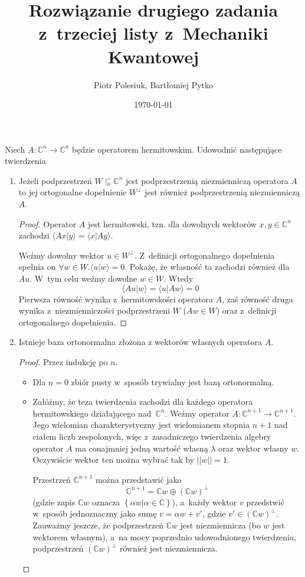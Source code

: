 \documentclass{article}
\title{Rozwiązanie drugiego zadania z~trzeciej listy z~Mechaniki Kwantowej}
\author{Piotr Polesiuk, Bartłomiej Pytko}
\date{\today}
\begin{document}
\maketitle

Niech $A\colon\mathbb{C}^n\to \mathbb{C}^n$
będzie operatorem hermitowskim. Udowodnić następujące twierdzenia
\begin{enumerate}
\item
Jeżeli podprzestrzeń $W\subseteq \mathbb{C}^n$ jest podprzestrzenią
niezmienniczą operatora $A$ to jej ortogonalne dopełnienie
$W^\perp$ jest również podprzestrzenią niezmienniczą $A$.

\begin{proof}
Operator $A$ jest hermitowski, tzn. dla dowolnych wektorów 
$x,y\in\mathbb{C}^n$ zachodzi 
\mbox{$\langle{}Ax|y\rangle=\langle{}x|Ay\rangle$}.

Weźmy dowolny wektor $u\in W^\perp$. Z~definicji ortogonalnego dopełnienia 
spełnia on $\forall w\in W.\langle{}u|w\rangle=0$. Pokażę, że własność ta 
zachodzi również dla $Au$. W~tym celu weźmy dowolne $w\in W$. Wtedy
\[
\langle{}Au|w\rangle = \langle{}u|Aw\rangle = 0
\]
Pierwsza równość wynika z~hermitowskości operatora $A$, zaś równość 
druga wynika z~niezmienniczości podprzestrzeni $W$ ($Aw \in W$) oraz 
z~definicji ortogonalnego dopełnienia.
\end{proof}

\item
Istnieje baza ortonormalna złożona z wektorów własnych operatora $A$.

\begin{proof}
Przez indukcję po $n$.
\begin{itemize}
\item Dla $n=0$ zbiór pusty w~sposób trywialny jest bazą ortonormalną.
\item Załóżmy, że teza twierdzenia zachodzi dla każdego operatora 
hermitowskiego działającego nad~$\mathbb{C}^n$. 
Weźmy operator $A\colon\mathbb{C}^{n+1}\to\mathbb{C}^{n+1}$.
Jego wielomian charakterystyczny jest wielomianem stopnia $n+1$ nad
ciałem liczb zespolonych, więc z~zasadniczego twierdzenia algebry
operator $A$ ma conajmniej jedną wartość własną $\lambda$ oraz wektor 
własny $w$. Oczywiście wektor ten można wybrać tak by $||w||=1$.

Przestrzeń $\mathbb{C}^{n+1}$ można przedstawić jako
\[
\mathbb{C}^{n+1} = \mathbb{C}w \oplus \left(\mathbb{C}w\right)^\perp
\]
(gdzie zapis $\mathbb{C}w$ oznacza 
$\left\{\alpha{}w | \alpha\in\mathbb{C}\right\}$), a~każdy wektor $v$
przedstwić w~sposób jednoznaczny jako sumę $v=\alpha{}w+v'$, gdzie 
$v'\in \left(\mathbb{C}w\right)^\perp$. Zauważmy jeszcze, że podprzestrzeń
$\mathbb{C}w$ jest niezmiennicza (bo $w$ jest wektorem własnym), a~na
mocy poprzednio udowodnionego twierdzenia, podprzestrzeń 
$\left(\mathbb{C}w\right)^\perp$ również jest niezmiennicza.


\end{itemize}
\end{proof}
\end{enumerate}
\end{document}
